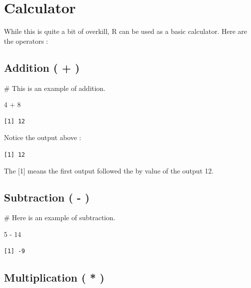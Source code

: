 \documentclass[
  letterpaper,
  DIV=11,
  numbers=noendperiod]{scrreprt}
\newenvironment{Shaded}{\begin{snugshade}}{\end{snugshade}}
\newcommand{\CommentTok}[1]{\textcolor[rgb]{0.37,0.37,0.37}{#1}}
\newcommand{\DecValTok}[1]{\textcolor[rgb]{0.68,0.00,0.00}{#1}}
\newcommand{\SpecialCharTok}[1]{\textcolor[rgb]{0.37,0.37,0.37}{#1}}
\begin{document}
\section*{Calculator}\label{calculator}


While this is quite a bit of overkill, R can be used as a basic
calculator. Here are the operators :

\subsection*{Addition ( + )}\label{addition}

\begin{Shaded}
\begin{Highlighting}[]
\CommentTok{\# This is an example of addition.}

\DecValTok{4} \SpecialCharTok{+} \DecValTok{8}
\end{Highlighting}
\end{Shaded}

\begin{verbatim}
[1] 12
\end{verbatim}

Notice the output above :

\texttt{{[}1{]}\ 12}

The {[}1{]} means the first output followed the by value of the output
12.

\subsection*{Subtraction ( - )}\label{subtraction--}

\begin{Shaded}
\begin{Highlighting}[]
\CommentTok{\# Here is an example of subtraction.}

\DecValTok{5} \SpecialCharTok{{-}} \DecValTok{14}
\end{Highlighting}
\end{Shaded}

\begin{verbatim}
[1] -9
\end{verbatim}

\subsection*{Multiplication ( * )}\label{multiplication}
\end{document}
